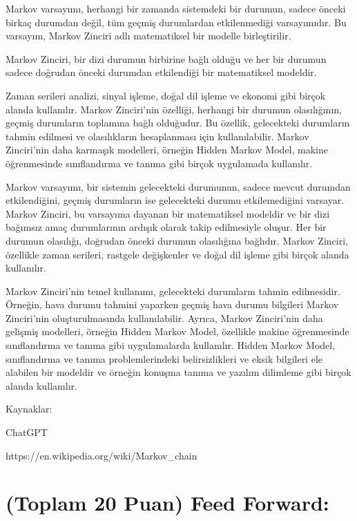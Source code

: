 \documentclass[11pt]{article}
\begin{document}
Markov varsayımı, herhangi bir zamanda sistemdeki bir durumun, sadece önceki birkaç durumdan değil, tüm geçmiş durumlardan etkilenmediği varsayımıdır. 
Bu varsayım, Markov Zinciri adlı matematiksel bir modelle birleştirilir. 

Markov Zinciri, bir dizi durumun birbirine bağlı olduğu ve her bir durumun sadece doğrudan önceki durumdan etkilendiği bir matematiksel modeldir. 

 Zaman serileri analizi, sinyal işleme, doğal dil işleme ve ekonomi gibi birçok alanda kullanılır. Markov Zinciri'nin özelliği, herhangi bir durumun olasılığının, geçmiş durumların toplamına bağlı olduğudur. Bu özellik, gelecekteki durumların tahmin edilmesi ve olasılıkların hesaplanması için kullanılabilir. 
 Markov Zinciri'nin daha karmaşık modelleri, örneğin Hidden Markov Model, makine öğrenmesinde sınıflandırma ve tanıma gibi birçok uygulamada kullanılır.


Markov varsayımı, bir sistemin gelecekteki durumunun, sadece mevcut durumdan etkilendiğini, geçmiş durumların ise gelecekteki durumu etkilemediğini varsayar. Markov Zinciri, bu varsayıma dayanan bir matematiksel modeldir ve bir dizi bağımsız amaç durumlarının ardışık olarak takip edilmesiyle oluşur. Her bir durumun olasılığı, doğrudan önceki durumun olasılığına bağlıdır. Markov Zinciri, özellikle zaman serileri, rastgele değişkenler ve doğal dil işleme gibi birçok alanda kullanılır.

Markov Zinciri'nin temel kullanımı, gelecekteki durumların tahmin edilmesidir. Örneğin, hava durumu tahmini yaparken geçmiş hava durumu bilgileri Markov Zinciri'nin oluşturulmasında kullanılabilir. Ayrıca, Markov Zinciri'nin daha gelişmiş modelleri, örneğin Hidden Markov Model, özellikle makine öğrenmesinde sınıflandırma ve tanıma gibi uygulamalarda kullanılır. Hidden Markov Model, sınıflandırma ve tanıma problemlerindeki belirsizlikleri ve eksik bilgileri ele alabilen bir modeldir ve örneğin konuşma tanıma ve yazılım dilimleme gibi birçok alanda kullanılır.

Kaynaklar:

ChatGPT

https://en.wikipedia.org/wiki/Markov_chain


\section{(Toplam 20 Puan) Feed Forward:}
 
\end{document}
